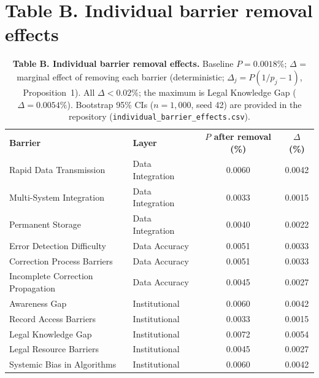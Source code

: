 \documentclass[10pt,letterpaper]{article}
\newlength\savedwidth
\newcommand\thickhline{\noalign{\global\savedwidth\arrayrulewidth\global\arrayrulewidth 2pt}\hline\noalign{\global\arrayrulewidth\savedwidth}}
\begin{document}
\section*{Table B. Individual barrier removal effects}
\begin{table}[!ht]\centering
\caption{{\bf Table B. Individual barrier removal effects.} Baseline $P=0.0018\%$; $\Delta$ = marginal effect of removing each barrier (deterministic; $\Delta_j=P(1/p_j-1)$, Proposition~1). All $\Delta<0.02\%$; the maximum is Legal Knowledge Gap ($\Delta=0.0054\%$). Bootstrap 95\% CIs ($n=1{,}000$, seed 42) are provided in the repository (\texttt{individual\_barrier\_effects.csv}).}
\label{S2}
\begin{tabular}{l l c c}
\hline \textbf{Barrier} & \textbf{Layer} & \textbf{$P$ after removal (\%)} & \textbf{$\Delta$ (\%)} \\ \thickhline
Rapid Data Transmission & Data Integration & 0.0060 & 0.0042 \\
Multi-System Integration & Data Integration & 0.0033 & 0.0015 \\
Permanent Storage & Data Integration & 0.0040 & 0.0022 \\ \hline
Error Detection Difficulty & Data Accuracy & 0.0051 & 0.0033 \\
Correction Process Barriers & Data Accuracy & 0.0051 & 0.0033 \\
Incomplete Correction Propagation & Data Accuracy & 0.0045 & 0.0027 \\ \hline
Awareness Gap & Institutional & 0.0060 & 0.0042 \\
Record Access Barriers & Institutional & 0.0033 & 0.0015 \\
Legal Knowledge Gap & Institutional & 0.0072 & 0.0054 \\
Legal Resource Barriers & Institutional & 0.0045 & 0.0027 \\
Systemic Bias in Algorithms & Institutional & 0.0060 & 0.0042 \\ \hline
\end{tabular}
\end{table}

\end{document}
